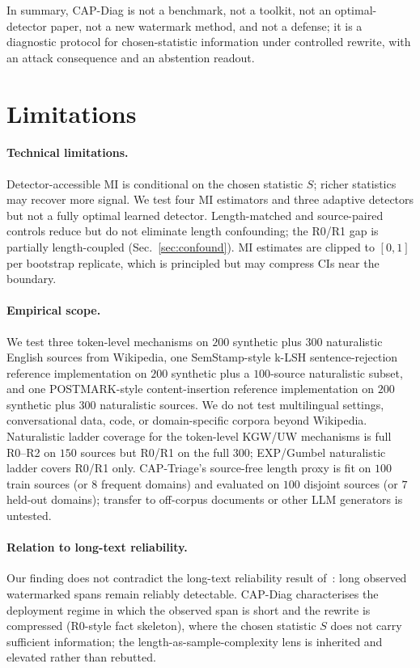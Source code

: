 \documentclass[11pt]{article}
\begin{document}
In summary, CAP-Diag is not a benchmark, not a toolkit, not an
optimal-detector paper, not a new watermark method, and not a defense; it
is a diagnostic protocol for chosen-statistic information under
controlled rewrite, with an attack consequence and an abstention readout.

\section{Limitations}
\label{sec:limitations}

\paragraph{Technical limitations.}
Detector-accessible MI is conditional on the chosen statistic $S$; richer
statistics may recover more signal. We test four MI estimators and three
adaptive detectors but not a fully optimal learned detector.
Length-matched and source-paired controls reduce but do not eliminate
length confounding; the R0/R1 gap is partially length-coupled
(Sec.~\ref{sec:confound}). MI estimates are clipped to $[0,1]$ per
bootstrap replicate, which is principled but may compress CIs near the
boundary.

\paragraph{Empirical scope.}
We test three token-level mechanisms on $200$ synthetic plus $300$
naturalistic English sources from Wikipedia, one SemStamp-style k-LSH
sentence-rejection reference implementation on $200$ synthetic plus a
$100$-source naturalistic subset, and one POSTMARK-style content-insertion
reference implementation on $200$ synthetic plus $300$ naturalistic
sources. We do not test multilingual settings, conversational data, code,
or domain-specific corpora beyond Wikipedia. Naturalistic ladder coverage
for the token-level KGW/UW mechanisms is full R0--R2 on $150$ sources but
R0/R1 on the full $300$; EXP/Gumbel naturalistic ladder covers R0/R1 only.
CAP-Triage's source-free length proxy is fit on $100$ train sources (or
$8$ frequent domains) and evaluated on $100$ disjoint sources (or $7$
held-out domains); transfer to off-corpus documents or other LLM
generators is untested.

\paragraph{Relation to long-text reliability.}
Our finding does not contradict the long-text reliability result
of~\citet{kirchenbauer2024reliability}: long observed watermarked spans
remain reliably detectable. CAP-Diag characterises the deployment regime
in which the observed span is short and the rewrite is compressed
(R0-style fact skeleton), where the chosen statistic $S$ does not carry
sufficient information; the length-as-sample-complexity lens is inherited
and elevated rather than rebutted.
\end{document}
